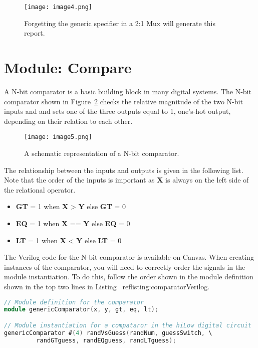 \begin{figure}[ht]
    \texttt{[image: image4.png]}
    \caption{Forgetting the generic specifier in a 2:1 Mux will generate this report.}
    \label{fig:vectorSizeWarnings}
\end{figure}

\hypertarget{compare-module}{%
\section{Module: Compare}\label{compare-module}}

A N-bit comparator is a basic building block in many digital systems.
The N-bit comparator shown in Figure~\ref{fig:comparatorSymbol}
checks the relative magnitude of
the two N-bit inputs  and  and sets one of the three
outputs equal to 1, one's-hot output, depending on their relation to
each other.

\begin{figure}[ht]
    \texttt{[image: image5.png]}
    \caption{A schematic representation of a N-bit comparator.}
    \label{fig:comparatorSymbol}
\end{figure}

The relationship between the inputs and outputs is given in the
following list. Note that the order of the inputs is important as
\textbf{X} is always on the left side of the relational operator.

\begin{itemize}
    \item    \textbf{GT} = 1 when \textbf{X} \textgreater{} \textbf{Y} else  \textbf{GT} = 0
    \item    \textbf{EQ} = 1 when \textbf{X} == \textbf{Y} else \textbf{EQ} = 0
    \item    \textbf{LT} = 1 when \textbf{X} \textless{} \textbf{Y} else   \textbf{LT} = 0
\end{itemize}

The Verilog code for the N-bit comparator is available on Canvas.
When creating instances of the comparator, you will need to correctly
order the signals in the module instantiation. To do this, follow the
order shown in the module definition shown in the top two lines in
Listing ~ref{listing:comparatorVerilog}.

\begin{lstlisting}[language=Verilog,
 caption={Top, the module definition for the comparator.  Bottom, module
 instantiation of a comparator in Figure~\ref{fig:comparatorSymbol}. Remove the
component instantiation line break in your code.},
 label={listing:comparatorVerilog},
 frame=single]
// Module definition for the comparator
module genericComparator(x, y, gt, eq, lt);

// Module instantiation for a compataror in the hiLow digital circuit
genericComparator #(4) randVsGuess(randNum, guessSwitch, \
         randGTguess, randEQguess, randLTguess);
\end{lstlisting}

